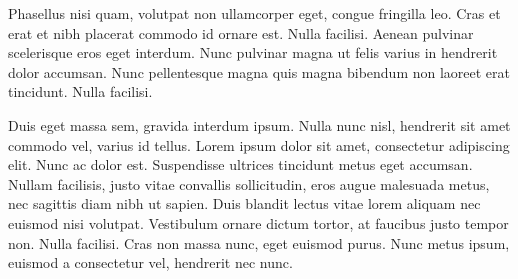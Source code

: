 Phasellus nisi quam, volutpat non ullamcorper eget, congue fringilla leo. Cras et erat et nibh placerat commodo id ornare est. Nulla facilisi. Aenean pulvinar scelerisque eros eget interdum. Nunc pulvinar magna ut felis varius in hendrerit dolor accumsan. Nunc pellentesque magna quis magna bibendum non laoreet erat tincidunt. Nulla facilisi.

Duis eget massa sem, gravida interdum ipsum. Nulla nunc nisl, hendrerit sit amet commodo vel, varius id tellus. Lorem ipsum dolor sit amet, consectetur adipiscing elit. Nunc ac dolor est. Suspendisse ultrices tincidunt metus eget accumsan. Nullam facilisis, justo vitae convallis sollicitudin, eros augue malesuada metus, nec sagittis diam nibh ut sapien. Duis blandit lectus vitae lorem aliquam nec euismod nisi volutpat. Vestibulum ornare dictum tortor, at faucibus justo tempor non. Nulla facilisi. Cras non massa nunc, eget euismod purus. Nunc metus ipsum, euismod a consectetur vel, hendrerit nec nunc.